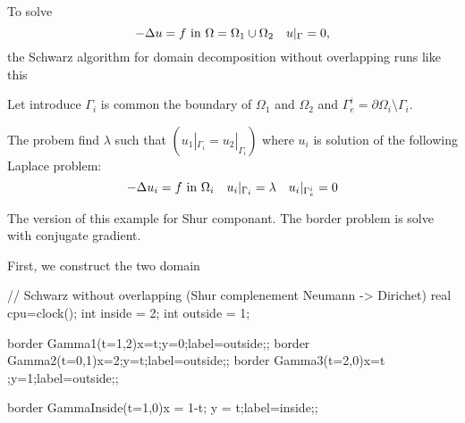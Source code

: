 \documentclass[twoside]{book}
\newif\ifpdf
\def\Blue#1{\textcolor{blue}{#1}}
\def\hin{\hbox{ in }}
\def\eq#1{\Blue{\[#1\]}}
\begin{document}
\graphicspath{{./}{plots/}}
\ifpdf
\DeclareGraphicsExtensions{.pdf, .jpg, .tif}
\else
{}
\fi

\let\subsubsection\subsection
\let\subsection\section
\let\section\chapter




To solve
\eq{ -\Delta u =f \hin\Omega=\Omega_1\cup\Omega_2\quad u|_\Gamma=0,}
the Schwarz algorithm for domain decomposition without overlapping  runs like this

Let introduce  $\Gamma_i$ is  common the boundary of $\Omega_1$ and
$\Omega_2$ and    $\Gamma_e^i= \partial \Omega_i \setminus  \Gamma_i$.

The probem  find  $\lambda$ such that $ (u_1|_{\Gamma_i}=u_2|_{\Gamma_i}) $
where  $u_i$ is solution of the following Laplace problem:
\eq{
    -\Delta u_i=f\hin\Omega_i\quad
    u_i|_{\Gamma_i}=\lambda \quad
    u_i|_{\Gamma_e^i} = 0 
 }

The version of this example for  Shur componant. The border problem
is solve with conjugate gradient. 

First, we construct the two domain 
\bFF

// Schwarz without overlapping (Shur complenement Neumann -> Dirichet)  
real cpu=clock();
int inside = 2; 
int outside = 1; 

border Gamma1(t=1,2){x=t;y=0;label=outside;};
border Gamma2(t=0,1){x=2;y=t;label=outside;};
border Gamma3(t=2,0){x=t ;y=1;label=outside;};

border GammaInside(t=1,0){x = 1-t; y = t;label=inside;};
\end{document}
